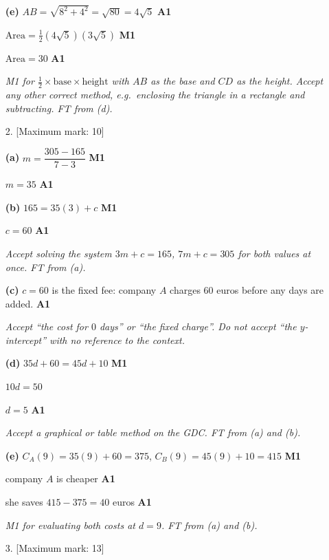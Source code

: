 \documentclass[12pt, twoside]{article}
\begin{document}
\begin{enumerate}[itemsep=0.3cm]
\textbf{(e)} $AB = \sqrt{8^{2} + 4^{2}} = \sqrt{80} = 4\sqrt{5}$ \hfill \textbf{A1}

$\text{Area} = \frac{1}{2}\left(4\sqrt{5}\right)\left(3\sqrt{5}\right)$ \hfill \textbf{M1}

$\text{Area} = 30$ \hfill \textbf{A1}

\emph{M1 for $\frac{1}{2} \times \text{base} \times \text{height}$ with
$AB$ as the base and $CD$ as the height. Accept any other correct method,
e.g.\ enclosing the triangle in a rectangle and subtracting. FT from (d).}

\newpage

\item[2.] [Maximum mark: 10]

\textbf{(a)} $m = \dfrac{305 - 165}{7 - 3}$ \hfill \textbf{M1}

$m = 35$ \hfill \textbf{A1}

\textbf{(b)} $165 = 35(3) + c$ \hfill \textbf{M1}

$c = 60$ \hfill \textbf{A1}

\emph{Accept solving the system $3m + c = 165$, $7m + c = 305$ for both
values at once. FT from (a).}

\textbf{(c)} $c = 60$ is the fixed fee: company $A$ charges $60$ euros
before any days are added. \hfill \textbf{A1}

\emph{Accept ``the cost for $0$ days'' or ``the fixed charge''. Do not accept
``the $y$-intercept'' with no reference to the context.}

\textbf{(d)} $35d + 60 = 45d + 10$ \hfill \textbf{M1}

$10d = 50$

$d = 5$ \hfill \textbf{A1}

\emph{Accept a graphical or table method on the GDC. FT from (a) and (b).}

\textbf{(e)} $C_{A}(9) = 35(9) + 60 = 375$, \quad $C_{B}(9) = 45(9) + 10 = 415$ \hfill \textbf{M1}

company $A$ is cheaper \hfill \textbf{A1}

she saves $415 - 375 = 40$ euros \hfill \textbf{A1}

\emph{M1 for evaluating both costs at $d = 9$. FT from (a) and (b).}

\newpage

\item[3.] [Maximum mark: 13]


\end{enumerate}
\end{document}
